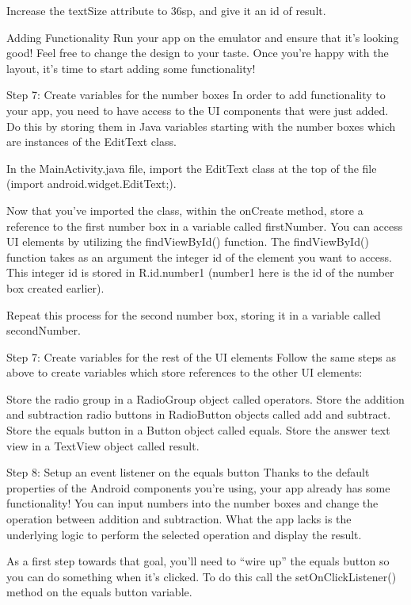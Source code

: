         Increase the textSize attribute to 36sp, and give it an id of result.

Adding Functionality
        Run your app on the emulator and ensure that it’s looking good! Feel free to change the design to your taste. Once you’re happy with the layout, it’s time to start adding some functionality!

    Step 7: Create variables for the number boxes
        In order to add functionality to your app, you need to have access to the UI components that were just added. Do this by storing them in Java variables starting with the number boxes which are instances of the EditText class.

        In the MainActivity.java file, import the EditText class at the top of the file (import android.widget.EditText;).

        Now that you’ve imported the class, within the onCreate method, store a reference to the first number box in a variable called firstNumber. You can access UI elements by utilizing the findViewById() function. The findViewById() function takes as an argument the integer id of the element you want to access. This integer id is stored in R.id.number1 (number1 here is the id of the number box created earlier).

        Repeat this process for the second number box, storing it in a variable called secondNumber.

    Step 7: Create variables for the rest of the UI elements
        Follow the same steps as above to create variables which store references to the other UI elements:

        Store the radio group in a RadioGroup object called operators.
        Store the addition and subtraction radio buttons in RadioButton objects called add and subtract.
        Store the equals button in a Button object called equals.
        Store the answer text view in a TextView object called result.

    Step 8: Setup an event listener on the equals button
        Thanks to the default properties of the Android components you’re using, your app already has some functionality! You can input numbers into the number boxes and change the operation between addition and subtraction. What the app lacks is the underlying logic to perform the selected operation and display the result.

        As a first step towards that goal, you’ll need to “wire up” the equals button so you can do something when it’s clicked. To do this call the setOnClickListener() method on the equals button variable.


